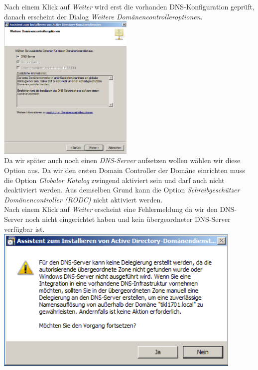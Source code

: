 \documentclass[12pt,a4paper,titlepage]{article} %
\begin{document}
Nach einem Klick auf \emph{Weiter} wird erst die vorhanden DNS-Konfiguration geprüft, danach erscheint der Dialog \emph{Weitere Domänencontrolleroptionen}.\\

	\includegraphics[height=7cm]{Bilder/021(dcpromo_exe08)}\\

Da wir später auch noch einen \emph{DNS-Server} aufsetzen wollen wählen wir diese Option aus. Da wir den ersten Domain Controller der Domäne einrichten muss die Option \emph{Globaler Katalog} zwingend aktiviert sein und darf auch nicht deaktiviert werden. Aus demselben Grund kann die Option \emph{Schreibgeschützer Domänencontroller (RODC)} nicht aktiviert werden.\\
Nach einem Klick auf \emph{Weiter} erscheint eine Fehlermeldung da wir den DNS-Server noch nicht eingerichtet haben und kein übergeordneter DNS-Server verfügbar ist.\\

	\includegraphics[height=7cm]{Bilder/022(dcpromo_exe09)}\\
	
\end{document}
